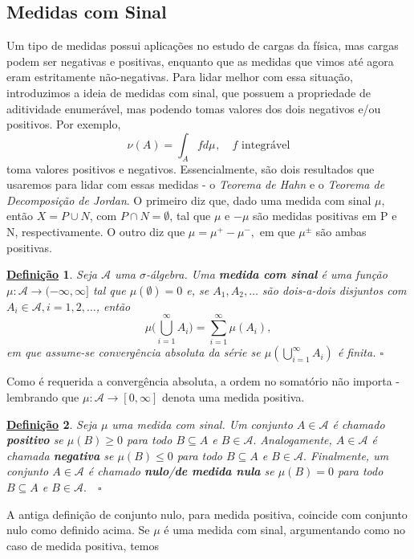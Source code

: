 \documentclass{article}
\newtheorem*{def*}{\underline{Defini\c c\~ao}}
\begin{document}
\subsection{Medidas com Sinal}
  Um tipo de medidas possui aplicações no estudo de cargas da física, mas cargas podem ser negativas e positivas, enquanto que as medidas que vimos até agora eram estritamente não-negativas. Para lidar melhor com essa situação, introduzimos a ideia de medidas 
com sinal, que possuem a propriedade de aditividade enumerável, mas podendo tomas valores dos dois negativos e/ou positivos. Por exemplo,
  \[
    \nu(A) = \int_{A}f d\mu_{},\quad f \text{ integrável}
  \]
  toma valores positivos e negativos. Essencialmente, são dois resultados que usaremos para lidar com essas medidas - o \textit{Teorema de Hahn} e o \textit{Teorema de Decomposição de Jordan}. O primeiro diz que, 
  dado uma medida com sinal \(\mu \), então \(X = P\cup N\), com \(P\cap N = \emptyset \), tal que \(\mu \) e \(-\mu \) são medidas positivas em P e N, respectivamente. O outro diz que \(\mu  = \mu ^{+} - \mu ^{-},\) em que \(\mu ^{\pm}\) são ambas positivas.
 \begin{def*}
   Seja \(\mathcal{A}\) uma \(\sigma \)-álgebra. Uma \textbf{medida com sinal} é uma função \(\mu : \mathcal{A}\rightarrow (-\infty, \infty]\) tal que \(\mu (\emptyset ) = 0\) e, se \(A_{1}, A_2, \dotsc \) são dois-a-dois disjuntos com \(A_{i}\in \mathcal{A}, i = 1, 2, \dotsc \), então 
     \[
       \mu \biggl(\bigcup_{i=1}^{\infty}A_{i}\biggr) = \sum\limits_{i=1}^{\infty}\mu (A_{i}),
     \]
  em que assume-se convergência absoluta da série se \(\mu (\bigcup_{i=1}^{\infty}A_{i})\) é finita. \(\square\)
 \end{def*}
 Como é requerida a convergência absoluta, a ordem no somatório não importa - lembrando que \(\mu :\mathcal{A}\rightarrow [0, \infty]\) denota uma medida positiva.
\begin{def*}
  Seja \(\mu \) uma medida com sinal. Um conjunto \(A\in \mathcal{A}\) é chamado \textbf{positivo} se \(\mu (B) \geq 0\) para todo \(B\subseteq A\) e \(B\in \mathcal{A}.\) Analogamente, \(A\in \mathcal{A}\) é chamada \textbf{negativa} se \(\mu (B)\leq 0\) para 
todo \(B\subseteq A\) e \(B\in \mathcal{A}.\) Finalmente, um conjunto \(A\in \mathcal{A}\) é chamado \textbf{nulo}/\textbf{de medida nula} se \(\mu (B) = 0 \) para todo \(B\subseteq A\) e \(B\in \mathcal{A}.\quad \square\)
\end{def*}
  A antiga definição de conjunto nulo, para medida positiva, coincide com conjunto nulo como definido acima. Se \(\mu \) é uma medida com sinal, argumentando como no caso de medida positiva, temos 
\end{document}
